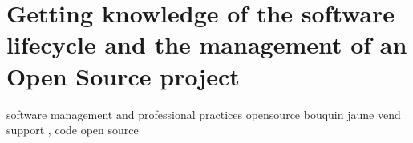 \chapter{Getting knowledge of the software lifecycle and the management of an Open Source project}
\label{ch:sdlc}
software management and professional practices
opensource bouquin jaune
vend support , code open source